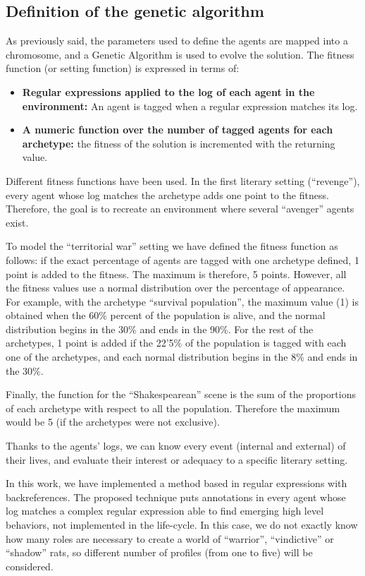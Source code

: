 \documentclass[letterpaper]{article}
\begin{document}
\subsection{Definition of  the genetic algorithm}

As previously said, the parameters used to define the agents are mapped into a chromosome, and a Genetic Algorithm is used to evolve the solution. The fitness function (or setting function) is expressed in terms of:

\begin{itemize}
\item \textbf{Regular expressions applied to the log of each agent in the environment:} An agent is tagged when a regular expression matches its log.
\item \textbf{A numeric function over the number of tagged agents for each archetype:} the fitness of the solution is incremented with the returning value.
\end{itemize}

Different fitness functions have been used. In the first literary setting (``revenge''), every agent whose log matches the archetype adds one point to the fitness. Therefore, the goal is to recreate an environment where several ``avenger'' agents exist.

To model the ``territorial war'' setting we have defined the fitness function as follows: if the exact percentage of agents are tagged with one archetype defined, 1 point is added to the fitness. The maximum is therefore, 5 points. However, all the fitness values use a normal distribution over the percentage of appearance. For example, with the archetype ``survival population'', the maximum value (1) is obtained when the 60\% percent of the population is alive, and the normal distribution begins in the 30\% and ends in the 90\%. For the rest of the archetypes, 1 point is added if the 22'5\% of the population is tagged with each one of the archetypes, and each normal distribution begins in the 8\% and ends in the 30\%.

Finally, the function for the ``Shakespearean'' scene is the sum of the proportions of each archetype with respect to all the population. Therefore the maximum would be 5 (if the archetypes were not exclusive). 


Thanks to the agents' logs, we can know every event (internal and
external) of their lives, and evaluate their interest or
adequacy to a specific literary setting.

In this work, we have implemented a method based in regular expressions with backreferences. The proposed technique puts annotations in every agent whose log matches a complex regular expression able to find emerging high level behaviors, not implemented in the life-cycle. In this case,
 we do not exactly know how many roles are necessary to create a world of ``warrior'', ``vindictive'' or ``shadow''
  rats, so different number of profiles (from one to five) will be considered.
\end{document}
